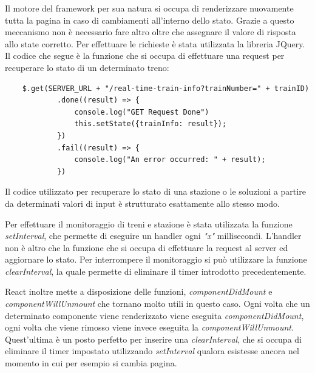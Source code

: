 \noindent Il motore del framework per sua natura si occupa di renderizzare nuovamente tutta la pagina in caso di cambiamenti all'interno dello stato.
Grazie a questo meccanismo non è necessario fare altro oltre che assegnare il valore di risposta allo state corretto. Per effettuare le richieste è stata utilizzata la libreria JQuery.\newline
Il codice che segue è la funzione che si occupa di effettuare una request per recuperare lo stato di un determinato treno:
\begin{verbatim}
    $.get(SERVER_URL + "/real-time-train-info?trainNumber=" + trainID)
            .done((result) => {
                console.log("GET Request Done")
                this.setState({trainInfo: result});
            })
            .fail((result) => {
                console.log("An error occurred: " + result);
            })
\end{verbatim}

\noindent Il codice utilizzato per recuperare lo stato di una stazione o le soluzioni a partire da determinati valori di input è strutturato esattamente allo stesso modo.\newline

\noindent Per effettuare il monitoraggio di treni e stazione è stata utilizzata la funzione \textit{setInterval}, che permette di eseguire un handler ogni \textit{"x"} millisecondi. L'handler non è altro che la funzione che si occupa di effettuare la request al server ed aggiornare lo stato.\newline
Per interrompere il monitoraggio si può utilizzare la funzione \textit{clearInterval}, la quale permette di eliminare il timer introdotto precedentemente.\newline

\noindent React inoltre mette a disposizione delle funzioni, \textit{componentDidMount} e \textit{componentWillUnmount} che tornano molto utili in questo caso. Ogni volta che un determinato componente viene renderizzato viene eseguita \textit{componentDidMount}, ogni volta che viene rimosso viene invece eseguita la \textit{componentWillUnmount}. Quest'ultima è un posto perfetto per inserire una \textit{clearInterval}, che si occupa di eliminare il timer impostato utilizzando \textit{setInterval} qualora esistesse ancora nel momento in cui per esempio si cambia pagina.

